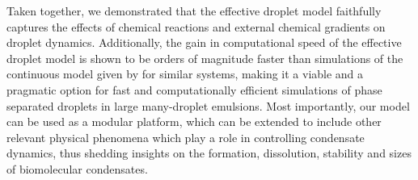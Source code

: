 Taken together, we demonstrated that the effective droplet model faithfully captures the effects of chemical reactions and external chemical gradients on droplet dynamics.
Additionally, the gain in computational speed of the effective droplet model is shown to be orders of magnitude faster than simulations of the continuous model given by  for similar systems, making it a viable and a pragmatic option for fast and computationally efficient simulations of phase separated droplets in large many-droplet emulsions.
Most importantly, our model can be used as a modular platform, which can be extended to include other relevant physical phenomena which play a role in controlling condensate dynamics, thus shedding insights on the formation, dissolution, stability and sizes of biomolecular condensates.
